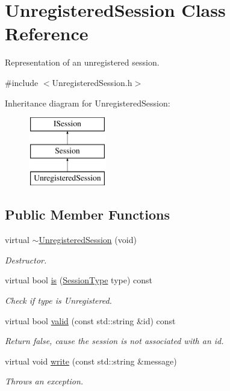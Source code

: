 \hypertarget{class_unregistered_session}{\section{Unregistered\-Session Class Reference}
\label{class_unregistered_session}
}


Representation of an unregistered session.  




{\ttfamily \#include $<$Unregistered\-Session.\-h$>$}

Inheritance diagram for Unregistered\-Session\-:\begin{figure}[H]
\begin{center}
\leavevmode
\includegraphics[height=3.000000cm]{class_unregistered_session}
\end{center}
\end{figure}
\subsection*{Public Member Functions}
\begin{DoxyCompactItemize}
\item 
\hypertarget{class_unregistered_session_a8ff4c967364ff77be4522877d7c814d8}{virtual \hyperlink{class_unregistered_session_a8ff4c967364ff77be4522877d7c814d8}{$\sim$\-Unregistered\-Session} (void)}\label{class_unregistered_session_a8ff4c967364ff77be4522877d7c814d8}

\begin{DoxyCompactList}\small\item\em Destructor. \end{DoxyCompactList}\item 
virtual bool \hyperlink{class_unregistered_session_a5b40e3288ec28f66360e75e6f42cc736}{is} (\hyperlink{class_i_session_a7989a93d03d8345d213a021d7444a32f}{Session\-Type} type) const 
\begin{DoxyCompactList}\small\item\em Check if type is Unregistered. \end{DoxyCompactList}\item 
virtual bool \hyperlink{class_unregistered_session_a62d3d5de779c9a276aca1286063e6ecd}{valid} (const std\-::string \&id) const 
\begin{DoxyCompactList}\small\item\em Return false, cause the session is not associated with an id. \end{DoxyCompactList}\item 
virtual void \hyperlink{class_unregistered_session_a494b190737e24094eb9f7ba68e8453c8}{write} (const std\-::string \&message)
\begin{DoxyCompactList}\small\item\em Throws an exception. \end{DoxyCompactList}\end{DoxyCompactItemize}
